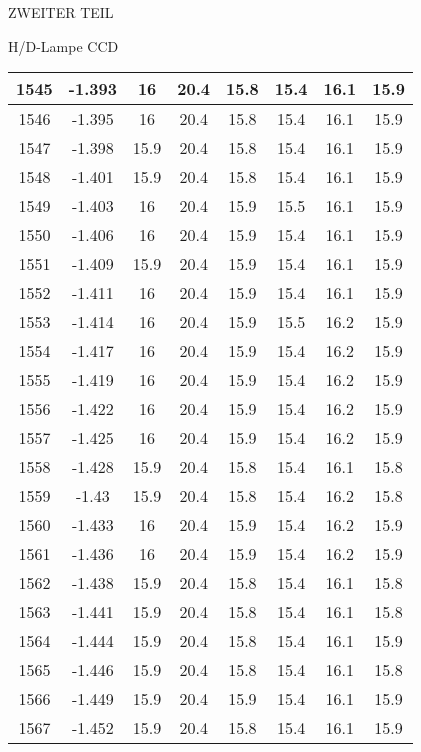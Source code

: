 \begin{appendix}
\begin{chapter}{ZWEITER TEIL}
\begin{section}{H/D-Lampe CCD}
\begin{scriptsize}
\begin{longtable}[htbp]{|c|c|c|c|c|c|c|c|}
            1545 & -1.393 & 16 & 20.4 & 15.8 & 15.4 & 16.1 & 15.9 \\ \hline
            1546 & -1.395 & 16 & 20.4 & 15.8 & 15.4 & 16.1 & 15.9 \\ \hline
            1547 & -1.398 & 15.9 & 20.4 & 15.8 & 15.4 & 16.1 & 15.9 \\ \hline
            1548 & -1.401 & 15.9 & 20.4 & 15.8 & 15.4 & 16.1 & 15.9 \\ \hline
            1549 & -1.403 & 16 & 20.4 & 15.9 & 15.5 & 16.1 & 15.9 \\ \hline
            1550 & -1.406 & 16 & 20.4 & 15.9 & 15.4 & 16.1 & 15.9 \\ \hline
            1551 & -1.409 & 15.9 & 20.4 & 15.9 & 15.4 & 16.1 & 15.9 \\ \hline
            1552 & -1.411 & 16 & 20.4 & 15.9 & 15.4 & 16.1 & 15.9 \\ \hline
            1553 & -1.414 & 16 & 20.4 & 15.9 & 15.5 & 16.2 & 15.9 \\ \hline
            1554 & -1.417 & 16 & 20.4 & 15.9 & 15.4 & 16.2 & 15.9 \\ \hline
            1555 & -1.419 & 16 & 20.4 & 15.9 & 15.4 & 16.2 & 15.9 \\ \hline
            1556 & -1.422 & 16 & 20.4 & 15.9 & 15.4 & 16.2 & 15.9 \\ \hline
            1557 & -1.425 & 16 & 20.4 & 15.9 & 15.4 & 16.2 & 15.9 \\ \hline
            1558 & -1.428 & 15.9 & 20.4 & 15.8 & 15.4 & 16.1 & 15.8 \\ \hline
            1559 & -1.43 & 15.9 & 20.4 & 15.8 & 15.4 & 16.2 & 15.8 \\ \hline
            1560 & -1.433 & 16 & 20.4 & 15.9 & 15.4 & 16.2 & 15.9 \\ \hline
            1561 & -1.436 & 16 & 20.4 & 15.9 & 15.4 & 16.2 & 15.9 \\ \hline
            1562 & -1.438 & 15.9 & 20.4 & 15.8 & 15.4 & 16.1 & 15.8 \\ \hline
            1563 & -1.441 & 15.9 & 20.4 & 15.8 & 15.4 & 16.1 & 15.8 \\ \hline
            1564 & -1.444 & 15.9 & 20.4 & 15.8 & 15.4 & 16.1 & 15.9 \\ \hline
            1565 & -1.446 & 15.9 & 20.4 & 15.8 & 15.4 & 16.1 & 15.8 \\ \hline
            1566 & -1.449 & 15.9 & 20.4 & 15.9 & 15.4 & 16.1 & 15.9 \\ \hline
            1567 & -1.452 & 15.9 & 20.4 & 15.8 & 15.4 & 16.1 & 15.9 \\ \hline

\end{longtable}
\end{scriptsize}
\end{section}
\end{chapter}
\end{appendix}

